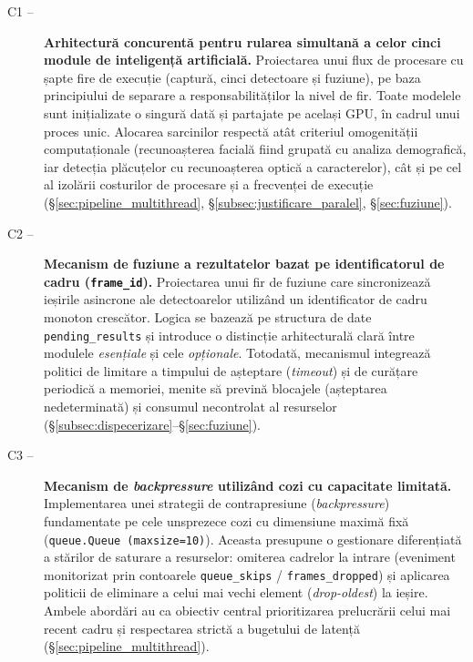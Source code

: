 \documentclass[../../main.tex]{subfiles}
\begin{document}
\begin{description}
	\item[C1 --] \textbf{Arhitectură concurentă pentru rularea simultană a celor cinci module de inteligență artificială.} Proiectarea unui flux de procesare cu șapte fire de execuție (captură, cinci detectoare și fuziune), pe baza principiului de separare a responsabilităților la nivel de fir. Toate modelele sunt inițializate o singură dată și partajate pe același GPU, în cadrul unui proces unic. Alocarea sarcinilor respectă atât criteriul omogenității computaționale (recunoașterea facială fiind grupată cu analiza demografică, iar detecția plăcuțelor cu recunoașterea optică a caracterelor), cât și pe cel al izolării costurilor de procesare și a frecvenței de execuție (\S\ref{sec:pipeline_multithread}, \S\ref{subsec:justificare_paralel}, \S\ref{sec:fuziune}).

	\item[C2 --] \textbf{Mecanism de fuziune a rezultatelor bazat pe identificatorul de cadru (\texttt{frame\_id}).} Proiectarea unui fir de fuziune care sincronizează ieșirile asincrone ale detectoarelor utilizând un identificator de cadru monoton crescător. Logica se bazează pe structura de date \texttt{pending\_results} și introduce o distincție arhitecturală clară între modulele \emph{esențiale} și cele \emph{opționale}. Totodată, mecanismul integrează politici de limitare a timpului de așteptare (\textit{timeout}) și de curățare periodică a memoriei, menite să prevină blocajele (așteptarea nedeterminată) și consumul necontrolat al resurselor (\S\ref{subsec:dispecerizare}--\S\ref{sec:fuziune}).

	\item[C3 --] \textbf{Mecanism de \textit{backpressure} utilizând cozi cu capacitate limitată.} Implementarea unei strategii de contrapresiune (\textit{backpressure}) fundamentate pe cele unsprezece cozi cu dimensiune maximă fixă (\texttt{queue.Queue \linebreak (maxsize=10)}). Aceasta presupune o gestionare diferențiată a stărilor de saturare a resurselor: omiterea cadrelor la intrare (eveniment monitorizat prin contoarele \texttt{queue\_skips} / \texttt{frames\_dropped}) și aplicarea politicii de eliminare a celui mai vechi element (\textit{drop-oldest}) la ieșire. Ambele abordări au ca obiectiv central prioritizarea prelucrării celui mai recent cadru și respectarea strictă a bugetului de latență (\S\ref{sec:pipeline_multithread}).


\end{description}
\end{document}
